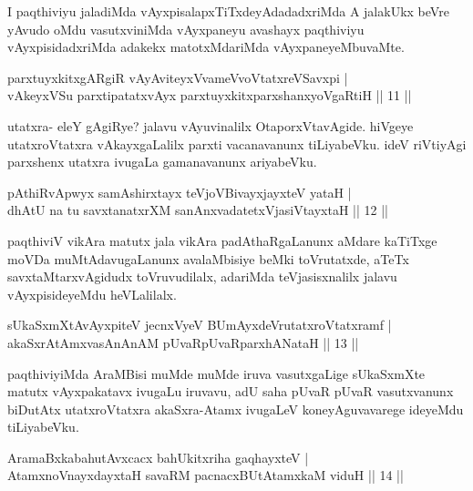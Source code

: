 \begin{artha}
I paqthiviyu jaladiMda vAyxpisalapxTiTxdeyAdadadxriMda A jalakUkx beVre yAvudo oMdu vasutxviniMda vAyxpaneyu avashayx paqthiviyu vAyxpisidadxriMda adakekx matotxMdariMda vAyxpaneyeMbuvaMte.
\end{artha}

\begin{shl}
parxtuyxkitxgARgiR vAyAviteyxVvameVvoVtatxreVSavxpi |\\
vAkeyxVSu parxtipatatxvAyx parxtuyxkitxparxshanxyoVgaRtiH \hfill || 11 ||
\end{shl}

\begin{artha}
utatxra- eleY gAgiRye? jalavu vAyuvinalilx OtaporxVtavAgide. hiVgeye utatxroVtatxra vAkayxgaLalilx parxti vacanavanunx tiLiyabeVku. ideV riVtiyAgi parxshenx utatxra ivugaLa gamanavanunx ariyabeVku.
\end{artha}


\begin{shl}
pAthiRvApwyx samAshirxtayx teVjoV\s BivayxjayxteV yataH |\\
dhAtU na tu savxtanatxrXM sanAnxvadatetxVjasiVtayxtaH \hfill || 12 ||
\end{shl}

\begin{artha}
paqthiviV vikAra matutx jala vikAra padAthaRgaLanunx aMdare kaTiTxge moVDa muMtAdavugaLanunx avalaMbisiye beMki toVrutatxde, aTeTx savxtaMtarxvAgidudx toVruvudilalx, adariMda teVjasisxnalilx jalavu vAyxpisideyeMdu heVLalilalx.
\end{artha}

\begin{shl}
sUkaSxmXtAvAyxpiteV jecnxVyeV BUmAyxdeVrutatxroVtatxramf |\\
akaSxrAtAmxvasAnAnAM pUvaRpUvaRparxhANataH \hfill || 13 ||
\end{shl}

\begin{artha}%
paqthiviyiMda AraMBisi muMde muMde iruva vasutxgaLige sUkaSxmXte matutx vAyxpakatavx ivugaLu iruvavu, adU saha pUvaR pUvaR vasutxvanunx biDutAtx utatxroVtatxra akaSxra-Atamx ivugaLeV koneyAguvavarege ideyeMdu tiLiyabeVku.
\end{artha}

\begin{shl}
AramaBxkabahutAvxcacx bahUkitxriha gaqhayxteV |\\
AtamxnoV\s nayxdayxtaH savaRM pacnacxBUtAtamxkaM viduH \hfill || 14 ||
\end{shl}


